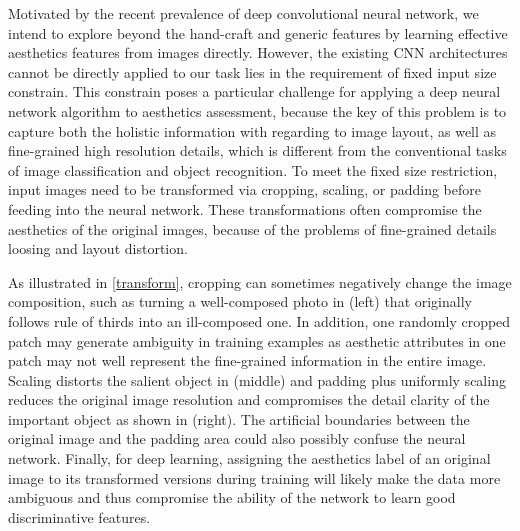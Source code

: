 \documentclass[10pt,twocolumn,letterpaper]{article}
\begin{document}
Motivated by the recent prevalence of deep convolutional neural network,
we intend to explore beyond the hand-craft and generic features 
by learning effective aesthetics features from images directly. 
However, the existing CNN architectures cannot be directly 
applied to our task lies in the requirement of fixed input size constrain. 
This constrain poses a particular challenge for applying a deep neural network 
algorithm to aesthetics assessment, because the key of this problem is to capture both the holistic information with regarding to image layout, as well as fine-grained high resolution details, which is different from the conventional tasks of image classification and object recognition.
To meet the fixed size restriction, input images
need to be transformed via cropping, scaling, or padding
before feeding into the neural network. These transformations
often compromise the aesthetics of the original images, because of the problems of fine-grained details loosing and layout distortion. 

As illustrated in \ref{transform}, cropping can sometimes
negatively change the image composition, such as turning
a well-composed photo in (left) that originally follows rule of
thirds into an ill-composed one. In addition, one randomly cropped 
patch may generate ambiguity in training examples as aesthetic 
attributes in one patch may not well represent the fine-grained 
information in the entire image. Scaling distorts the salient object 
in (middle) and padding plus uniformly scaling reduces the original image 
resolution and compromises the detail clarity of the important object 
as shown in (right). The artificial boundaries between the original image
and the padding area could also possibly confuse the neural network. 
Finally, for deep learning, assigning the aesthetics label 
of an original image to its transformed versions during training 
will likely make the data more ambiguous and thus compromise the 
ability of the network to learn good discriminative features.
\end{document}
